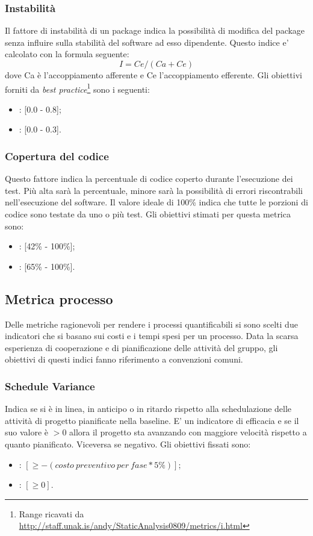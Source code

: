 \subsubsection{Instabilità}
\label{4.2.8}
Il fattore di instabilità di un package indica la possibilità di modifica del package senza influire sulla stabilità del software ad esso dipendente.
Questo indice e’ calcolato con la formula seguente:
$$I = Ce / (Ca + Ce)$$
dove Ca è l'accoppiamento afferente e Ce l'accoppiamento efferente.
Gli obiettivi forniti da \emph{best practice}\footnote{Range ricavati da \url{http://staff.unak.is/andy/StaticAnalysis0809/metrics/i.html}} sono i seguenti:
\begin{itemize}
\item {}: [0.0 - 0.8];
\item {}: [0.0 - 0.3].
\end{itemize}

\subsubsection{Copertura del codice}
\label{4.2.9}
Questo fattore indica la percentuale di codice coperto durante l'esecuzione dei test. Più alta sarà la percentuale, minore sarà la possibilità di errori riscontrabili nell'esecuzione del software. Il valore ideale di 100\% indica che tutte le porzioni di codice sono testate da uno o più test.
Gli obiettivi stimati per questa metrica sono:
\begin{itemize}
\item {}: [42\% - 100\%];
\item {}: [65\% - 100\%].
\end{itemize}


\subsection{Metrica processo} %
\label{4.3}
Delle metriche ragionevoli per rendere i processi quantificabili si sono scelti due indicatori che si basano sui costi e i tempi spesi per un processo. Data la scarsa esperienza di cooperazione e di pianificazione delle attività del gruppo, gli obiettivi di questi indici fanno riferimento a convenzioni comuni.

\subsubsection{Schedule Variance}
\label{4.3.1}
Indica se si è in linea, in anticipo o in ritardo rispetto alla schedulazione delle attività di progetto pianificate nella baseline. E' un indicatore di efficacia e se il suo valore è $> 0$ allora il progetto sta avanzando con maggiore velocità rispetto a quanto pianificato. Viceversa se negativo.
Gli obiettivi fissati sono:
\begin{itemize}
\item {}: $ [\geq -(costo\:preventivo\:per\:fase * 5\%)]; $
\item {}: $ [\geq 0]. $
\end{itemize}

